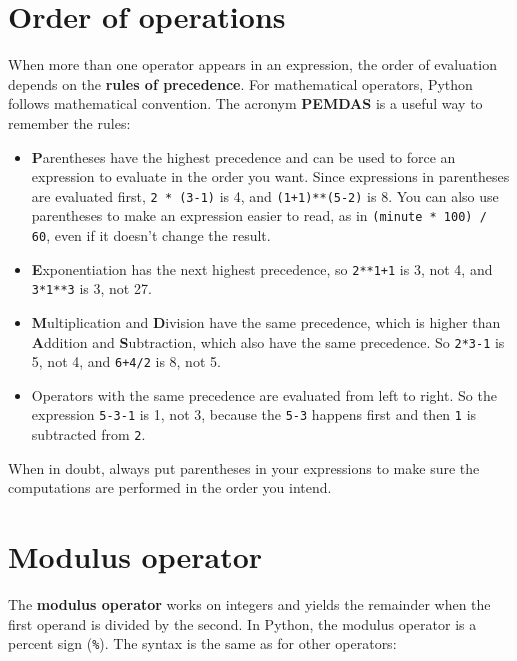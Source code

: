 \section{Order of operations}

When more than one operator appears in an expression, the order of
evaluation depends on the {\bf rules of precedence}.  For
mathematical operators, Python follows mathematical convention.
The acronym {\bf PEMDAS} is a useful way to
remember the rules:


\begin{itemize}

\item {\bf P}arentheses have the highest precedence and can be used 
to force an expression to evaluate in the order you want. Since
expressions in parentheses are evaluated first, {\tt 2 * (3-1)} is 4,
and {\tt (1+1)**(5-2)} is 8. You can also use parentheses to make an
expression easier to read, as in {\tt (minute * 100) / 60}, even
if it doesn't change the result.

\item {\bf E}xponentiation has the next highest precedence, so
{\tt 2**1+1} is 3, not 4, and {\tt 3*1**3} is 3, not 27.

\item {\bf M}ultiplication and {\bf D}ivision have the same precedence,
which is higher than {\bf A}ddition and {\bf S}ubtraction, which also
have the same precedence.  So {\tt 2*3-1} is 5, not 4, and
{\tt 6+4/2} is 8, not 5.

\item Operators with the same precedence are evaluated from left to 
right.  So the expression {\tt 5-3-1} is 1, not 3, because the
{\tt 5-3} happens first and then {\tt 1} is subtracted from {\tt 2}.

\end{itemize}

When in doubt, always put parentheses in your expressions to make sure
the computations are performed in the order you intend.

\section{Modulus operator}


The {\bf modulus operator} works on integers and yields the remainder
when the first operand is divided by the second.  In Python, the
modulus operator is a percent sign (\verb"%").  The syntax is the same
as for other operators:

